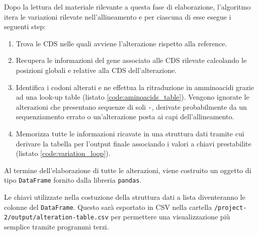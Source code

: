 \documentclass[11pt,italian]{article}
\begin{document}
\noindent
Dopo la lettura del materiale rilevante a questa fase di elaborazione, l'algoritmo itera le variazioni rilevate nell'allineamento e per ciascuna di esse esegue i seguenti step:
\begin{enumerate}
  \item Trova le CDS nelle quali avviene l'alterazione rispetto alla reference.
  \item Recupera le informazioni del gene associato alle CDS rilevate calcolando le posizioni globali e relative alla CDS dell'alterazione.
  \item Identifica i codoni alterati e ne effettua la ritraduzione in amminoacidi grazie ad una look-up table (listato \ref{code:aminoacids_table}). Vengono ignorate le alterazioni che presentano sequenze di soli \lstinline{-}, derivate probabilmente da un sequenziamento errato o un'alterazione posta ai capi dell'allineamento.
  \item Memorizza tutte le informazioni ricavate in una struttura dati tramite cui derivare la tabella per l'output finale associando i valori a chiavi prestabilite (listato \ref{code:variation_loop}).
\end{enumerate}

\noindent
Al termine dell'elaborazione di tutte le alterazioni, viene costruito un oggetto di tipo \lstinline{DataFrame} fornito dalla libreria \lstinline{pandas}.

Le chiavi utilizzate nella costuzione della struttura dati a lista diventeranno le colonne del \lstinline{DataFrame}. Questo sarà esportato in CSV nella cartella \lstinline{/project-2/output/alteration-table.csv} per permettere una visualizzazione più semplice tramite programmi terzi.

\newpage
\end{document}
